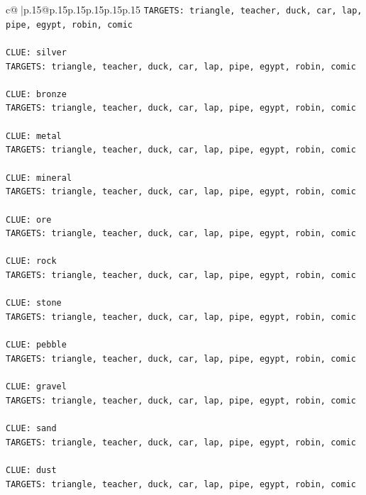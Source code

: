 \documentclass{article}
\begin{document}
{\begin{supertabular}{c@{$\;$}|p{.15\linewidth}@{}p{.15\linewidth}p{.15\linewidth}p{.15\linewidth}p{.15\linewidth}p{.15\linewidth}}
{{{\texttt{TARGETS: triangle, teacher, duck, car, lap, pipe, egypt, robin, comic} \\
\\ 
\texttt{CLUE: silver} \\
\texttt{TARGETS: triangle, teacher, duck, car, lap, pipe, egypt, robin, comic} \\
\\ 
\texttt{CLUE: bronze} \\
\texttt{TARGETS: triangle, teacher, duck, car, lap, pipe, egypt, robin, comic} \\
\\ 
\texttt{CLUE: metal} \\
\texttt{TARGETS: triangle, teacher, duck, car, lap, pipe, egypt, robin, comic} \\
\\ 
\texttt{CLUE: mineral} \\
\texttt{TARGETS: triangle, teacher, duck, car, lap, pipe, egypt, robin, comic} \\
\\ 
\texttt{CLUE: ore} \\
\texttt{TARGETS: triangle, teacher, duck, car, lap, pipe, egypt, robin, comic} \\
\\ 
\texttt{CLUE: rock} \\
\texttt{TARGETS: triangle, teacher, duck, car, lap, pipe, egypt, robin, comic} \\
\\ 
\texttt{CLUE: stone} \\
\texttt{TARGETS: triangle, teacher, duck, car, lap, pipe, egypt, robin, comic} \\
\\ 
\texttt{CLUE: pebble} \\
\texttt{TARGETS: triangle, teacher, duck, car, lap, pipe, egypt, robin, comic} \\
\\ 
\texttt{CLUE: gravel} \\
\texttt{TARGETS: triangle, teacher, duck, car, lap, pipe, egypt, robin, comic} \\
\\ 
\texttt{CLUE: sand} \\
\texttt{TARGETS: triangle, teacher, duck, car, lap, pipe, egypt, robin, comic} \\
\\ 
\texttt{CLUE: dust} \\
\texttt{TARGETS: triangle, teacher, duck, car, lap, pipe, egypt, robin, comic} \\
}}}
\end{supertabular}}
\end{document}
